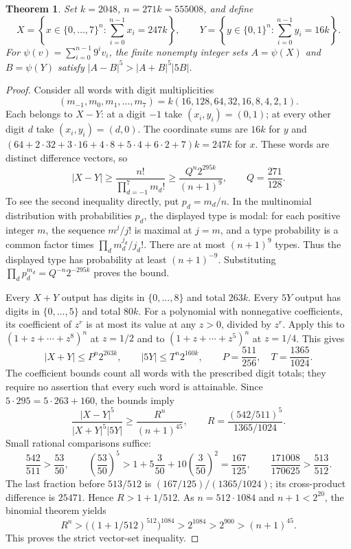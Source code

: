 \documentclass[11pt,a4paper]{article}
\newtheorem{theorem}{Theorem}
\begin{document}
\begin{theorem}\label{thm:binary-type}
Set $k=2048$, $n=271k=555008$, and define
\[
 X=\left\{x\in\{0,\ldots,7\}^n:\sum_{i=0}^{n-1}x_i=247k\right\},
 \qquad
 Y=\left\{y\in\{0,1\}^n:\sum_{i=0}^{n-1}y_i=16k\right\}.
\]
For $\psi(v)=\sum_{i=0}^{n-1}9^iv_i$, the finite nonempty integer sets
$A=\psi(X)$ and $B=\psi(Y)$ satisfy $|A-B|^5>|A+B|^5|5B|$.
\end{theorem}

\begin{proof}
Consider all words with digit multiplicities
\[
 (m_{-1},m_0,m_1,\ldots,m_7)
       =k(16,128,64,32,16,8,4,2,1).
\]
Each belongs to $X-Y$: at a digit $-1$ take $(x_i,y_i)=(0,1)$;
at every other digit $d$ take $(x_i,y_i)=(d,0)$. The coordinate sums
are $16k$ for $y$ and
$(64+2\cdot32+3\cdot16+4\cdot8+5\cdot4+6\cdot2+7)k=247k$ for $x$.
These words are distinct difference vectors, so
\begin{equation}\label{eq:binary-type-lower}
 |X-Y|\ge \frac{n!}{\prod_{d=-1}^{7}m_d!}
       \ge \frac{Q^n2^{295k}}{(n+1)^9},
 \qquad Q=\frac{271}{128}.
\end{equation}
To see the second inequality directly, put $p_d=m_d/n$. In the
multinomial distribution with probabilities $p_d$, the displayed type
is modal: for each positive integer $m$, the sequence $m^j/j!$ is
maximal at $j=m$, and a type probability is a common factor times
$\prod_d m_d^{j_d}/j_d!$. There are at most $(n+1)^9$ types. Thus the
displayed type has probability at least $(n+1)^{-9}$. Substituting
$\prod_d p_d^{m_d}=Q^{-n}2^{-295k}$ proves the bound.

Every $X+Y$ output has digits in $\{0,\ldots,8\}$ and total $263k$.
Every $5Y$ output has digits in $\{0,\ldots,5\}$ and total $80k$.
For a polynomial with nonnegative coefficients, its coefficient of
$z^r$ is at most its value at any $z>0$, divided by $z^r$.
Apply this to $(1+z+\cdots+z^8)^n$ at $z=1/2$ and to
$(1+z+\cdots+z^5)^n$ at $z=1/4$. This gives
\begin{equation}\label{eq:binary-type-upper}
 |X+Y|\le P^n2^{263k},\qquad |5Y|\le T^n2^{160k},
 \qquad P=\frac{511}{256},\quad T=\frac{1365}{1024}.
\end{equation}
The coefficient bounds count all words with the prescribed digit totals;
they require no assertion that every such word is attainable.
Since $5\cdot295=5\cdot263+160$, the bounds imply
\[
 \frac{|X-Y|^5}{|X+Y|^5|5Y|}
 \ge\frac{R^n}{(n+1)^{45}},
 \qquad R=\frac{(542/511)^5}{1365/1024}.
\]
Small rational comparisons suffice:
\[
 \frac{542}{511}>\frac{53}{50},\qquad
 \left(\frac{53}{50}\right)^5>
 1+5\frac3{50}+10\left(\frac3{50}\right)^2=\frac{167}{125},
 \qquad
 \frac{171008}{170625}>\frac{513}{512}.
\]
The last fraction before $513/512$ is $(167/125)/(1365/1024)$;
its cross-product difference is $25471$. Hence $R>1+1/512$.
As $n=512\cdot1084$ and $n+1<2^{20}$, the binomial theorem yields
\[
 R^n>\bigl((1+1/512)^{512}\bigr)^{1084}
      >2^{1084}>2^{900}>(n+1)^{45}.
\]
This proves the strict vector-set inequality.


\end{proof}
\end{document}
